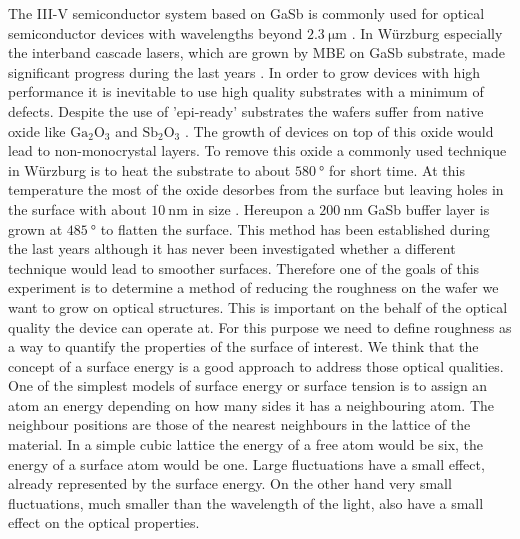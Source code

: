 The III-V semiconductor system based on GaSb is commonly used for optical semiconductor devices with wavelengths beyond $\SI{2.3}{\micro\meter}$ \cite{arafin}. In Würzburg especially the interband cascade lasers, which are grown by MBE on GaSb substrate, made significant progress during the last years \cite{weih}. In order to grow devices with high performance it is inevitable to use high quality substrates with a minimum of defects. Despite the use of 'epi-ready' substrates the wafers suffer from native oxide like $\mathrm{Ga}_2 \mathrm{O}_3$ and $\mathrm{Sb}_2 \mathrm{O}_3$ \cite{vineis}. The growth of devices on top of this oxide would lead to non-monocrystal layers. To remove this oxide a commonly used technique in Würzburg is to heat the substrate to about $\SI{580}{\degree}$ for short time. At this temperature the most of the oxide desorbes from the surface but leaving holes in the surface with about  $\SI{10}{\nano\meter}$ in size \cite{murray}. Hereupon a $\SI{200}{\nano\meter}$ GaSb buffer layer is grown at $\SI{485}{\degree}$ to flatten the surface. This method has been established during the last years although it has never been investigated whether a different technique would lead to smoother surfaces. Therefore one of the goals of this experiment is to determine a method of reducing the 
roughness on the wafer we want to grow on optical structures. This is important 
on the behalf of the optical quality the device can operate at.
For this purpose we need to define roughness as a way to quantify the properties 
of the surface of interest.
We think that the concept of a surface energy is a good approach to address 
those optical qualities. One of the simplest models of surface energy or surface 
tension  is to assign an atom an energy depending on how many sides it has a 
neighbouring atom. The neighbour positions are those of the nearest neighbours 
in the lattice of the material.  In a simple cubic lattice the energy of a free 
atom would be six, the energy of a surface atom would be one.
%
Large fluctuations have a small effect, already represented by the surface 
energy. On the other hand very small fluctuations, much smaller than the 
wavelength of the light, also have a small effect on the optical properties.  
